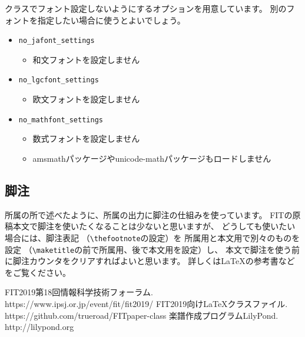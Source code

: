 \documentclass{FITpaper}
\begin{document}
クラスでフォント設定しないようにするオプションを用意しています。
別のフォントを指定したい場合に使うとよいでしょう。

\begin{itemize}
\item \texttt{no\_jafont\_settings}
  \begin{itemize}
  \item 和文フォントを設定しません
  \end{itemize}
\item \texttt{no\_lgcfont\_settings}
  \begin{itemize}
  \item 欧文フォントを設定しません
  \end{itemize}
\item \texttt{no\_mathfont\_settings}
  \begin{itemize}
  \item 数式フォントを設定しません
  \item amsmathパッケージやunicode-mathパッケージもロードしません
  \end{itemize}
\end{itemize}

\subsection{脚注}

所属の所で述べたように、所属の出力に脚注の仕組みを使っています。
FITの原稿本文で脚注を使いたくなることは少ないと思いますが、
どうしても使いたい場合には、脚注表記
（\texttt{\textbackslash thefootnote}の設定）を
所属用と本文用で別々のものを設定
（\texttt{\textbackslash maketitle}の前で所属用、後で本文用を設定）し、
本文で脚注を使う前に脚注カウンタをクリアすればよいと思います。
詳しくは\LaTeX の参考書などをご覧ください。


\begin{thebibliography}{9}

  FIT2019第18回情報科学技術フォーラム. \\
  https://www.ipsj.or.jp/event/fit/fit2019/
  FIT2019向け\LaTeX クラスファイル. \\
  https://github.com/trueroad/FITpaper-class
  楽譜作成プログラムLilyPond. \\
  http://lilypond.org

\end{thebibliography}
\end{document}
